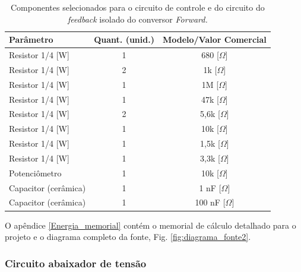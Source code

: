 \begin{table}[H]
    \centering
    \footnotesize
    \caption{Componentes selecionados para o circuito de controle e do circuito do \textit{feedback} isolado do conversor \textit{Forward.}}
    \label{Controle}
    \begin{adjustbox}{max width = \textwidth}
        \begin{tabular}{|l|c|c|}
            \hline
            \rowcolor[HTML]{A8DADC}
            Parâmetro & Quant. (unid.) & Modelo/Valor Comercial
            \\ \hline
            Resistor 1/4 [W] & 1 & 680 [$\Omega$]
             \\ \hline
             Resistor 1/4 [W] & 2 & 1k [$\Omega$]
             \\ \hline
             Resistor 1/4 [W] & 1 & 1M [$\Omega$]
             \\ \hline
             Resistor 1/4 [W] & 1 & 47k [$\Omega$]
             \\ \hline
             Resistor 1/4 [W] & 2 & 5,6k [$\Omega$]
             \\ \hline
             Resistor 1/4 [W] & 1 & 10k [$\Omega$]
             \\ \hline
             Resistor 1/4 [W] & 1 & 1,5k [$\Omega$]
             \\ \hline
             Resistor 1/4 [W] & 1 & 3,3k [$\Omega$]
             \\ \hline
             Potenciômetro & 1 & 10k [$\Omega$]
             \\ \hline
             Capacitor (cerâmica) & 1 & 1 nF [$\Omega$]
             \\ \hline
             Capacitor (cerâmica) & 1 & 100 nF [$\Omega$]
             \\ \hline
        \end{tabular}
    \end{adjustbox}
\end{table} 

O apêndice \ref{Energia_memorial} contém o memorial de cálculo detalhado para o projeto e o diagrama completo da fonte, Fig. \ref{fig:diagrama_fonte2}.

\subsubsection*{Circuito abaixador de tensão}


